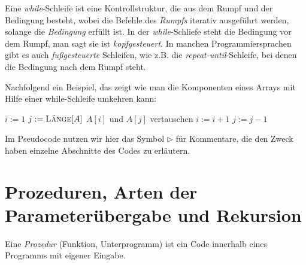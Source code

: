 \begin{bem} 
Eine \emph{while}-Schleife ist eine Kontrollstruktur, die aus dem Rumpf und der Bedingung besteht, wobei die Befehle des \emph{Rumpfs} iterativ ausgeführt werden, solange die \emph{Bedingung} erfüllt ist. In der \emph{while}-Schliefe steht die Bedingung vor dem Rumpf, man sagt sie ist \emph{kopfgesteuert}. In manchen Programmiersprachen gibt es auch \emph{fußgesteuerte} Schleifen, wie z.B. die \emph{repeat-until}-Schleife, bei denen die Bedingung nach dem Rumpf steht.
\end{bem} 

\begin{bem} 
Nachfolgend ein Beispiel, das zeigt wie man die Komponenten eines Arrays mit Hilfe einer while-Schleife umkehren kann:
\begin{center}
	\begin{algorithmic}[1]
		\STATE $i:=1$
		\STATE $j:=\mathop{\text{\textsc{L\"ange}}}[A]$
		\STATE $A[i]$ und $A[j]$ vertauschen 
		\STATE $i:=i+1$ 
		\STATE $j:=j-1$ 
		\ENDWHILE
	\end{algorithmic}
\end{center}
\end{bem} 

\begin{bem} 
Im Pseudocode nutzen wir hier das Symbol $\triangleright$ für Kommentare, die den Zweck haben einzelne Abschnitte des Codes zu erläutern.
\end{bem} 


\section{Prozeduren, Arten der Parameterübergabe und Rekursion}
\label{sect:prozeduren}

\begin{bem}
Eine \emph{Prozedur} (Funktion, Unterprogramm) ist ein Code innerhalb eines Programms mit eigener Eingabe. 
\end{bem} 

